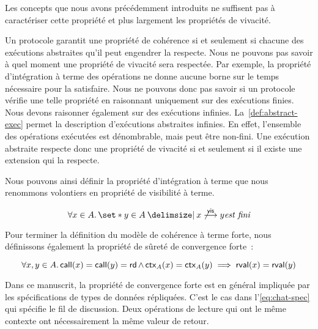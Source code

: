 Les concepts que nous avons précédemment introduits ne suffisent pas à caractériser cette propriété et plus largement les propriétés de vivacité.

Un protocole garantit une propriété de cohérence si et seulement si chacune des exécutions abstraites qu'il peut engendrer la respecte.
Nous ne pouvons pas savoir à quel moment une propriété de vivacité sera respectée.
Par exemple, la propriété d'intégration à terme des opérations ne donne aucune borne sur le temps nécessaire pour la satisfaire.
Nous ne pouvons donc pas savoir si un protocole vérifie une telle propriété en raisonnant uniquement sur des exécutions finies.
Nous devons raisonner également sur des exécutions infinies.
La~\autoref{def:abstract-exec} permet la description d'exécutions abstraites infinies.
En effet, l'ensemble des opérations exécutées est dénombrable, mais peut être non-fini.
Une exécution abstraite respecte donc une propriété de vivacité si et seulement si il existe une extension qui la respecte.



Nous pouvons ainsi définir la propriété d'intégration à terme que nous renommons volontiers en propriété de visibilité à terme.

\begin{equation}
    \forall x \in A \qsep \set*{y \in A \given x \not\vis y} \textit{est fini}
\end{equation}

Pour terminer la définition du modèle de cohérence à terme forte, nous définissons également la propriété de sûreté de convergence forte~:

\begin{equation}
    \forall x, y \in A \ldotp \operatorname{\mathsf{call}}(x) = \operatorname{\mathsf{call}}(y) = \operatorname{\mathsf{rd}} \land \operatorname{\mathsf{ctx}}_A(x) = \operatorname{\mathsf{ctx}}_A(y) \implies \operatorname{\mathsf{rval}}(x) = \operatorname{\mathsf{rval}}(y)
\end{equation}

Dans ce manuscrit, la propriété de convergence forte est en général impliquée par les spécifications de types de données répliquées.
C'est le cas dans l'\autoref{eq:chat-spec} qui spécifie le fil de discussion.
Deux opérations de lecture qui ont le même contexte ont nécessairement la même valeur de retour.



